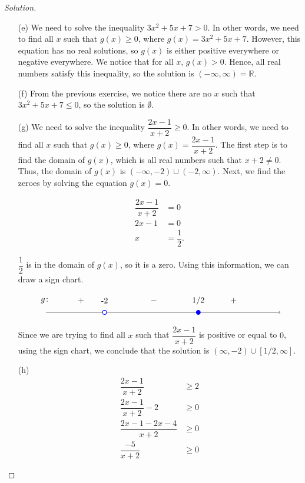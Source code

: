 \documentclass[12pt]{article}
\newenvironment{solution}{\begin{proof}[Solution]}{\end{proof}}
\begin{document}
\begin{enumerate}
\begin{solution}
\begin{itemize}
				Since $0>\dfrac{1}{4}$ is false for any $x$, there is no real solution to this inequality. We say that the solution is $\emptyset$ (the \textit{empty set}).
				\item[(e)] 	We need to solve the inequality $3x^2+5x+7> 0$. In other words, we need to find all $x$ such that $g(x) \geq 0$, where $g(x)=3x^2+5x+7$. However, this equation has no real solutions, so $g(x)$ is either positive everywhere or negative everywhere. We notice that for all $x$, $g(x)>0$. Hence, all real numbers satisfy this inequality, so the solution is $(-\infty,\infty)=\mathbb{R}$.
				\item[(f)] 	From the previous exercise, we notice there are no $x$ such that $3x^2+5x+7\leq 0$, so the solution is $\emptyset$.
				\item[(g)] 	We need to solve the inequality $\dfrac{2x-1}{x+2}\geq 0$. In other words, we need to find all $x$ such that $g(x) \geq 0$, where $g(x)=\dfrac{2x-1}{x+2}$. The first step is to find the domain of $g(x)$, which is all real numbers such that $x+2\neq0$. Thus, the domain of $g(x)$ is $(-\infty, -2) \cup (-2, \infty) $. Next, we find the zeroes by solving the equation $g(x)=0$.
				
				\begin{align*}
					\dfrac{2x-1}{x+2}&=0\\
					2x-1&=0\\
					x&=\dfrac{1}{2}.
				\end{align*}
				
				$\dfrac{1}{2}$ is in the domain of $g(x)$, so it is a zero. Using this information, we can draw a sign chart. 
				
				\[
				\begin{tikzpicture}[scale=1]
					\draw[->] (-5,0) -- (5,0);
					
					\draw (1.5,0) node[circle,blue,fill,inner sep=2pt]{};
					\draw[blue, thick, fill=white] (-2.5,0) circle (2.5pt);
					
					\node at (-2.5, .5) {-2};
					\node at (1.5, .5) {1/2};
					\node at (-5,.5) {$g\colon$};
					\node at (-3.5,.5) {$+$};
					\node at (-0.4,.5) {$-$};
					\node at (3, .5) {$+$};
				\end{tikzpicture}
				\]		
				
				Since we are trying to find all $x$ such that $\dfrac{2x-1}{x+2}$ is positive or equal to $0$, using the sign chart, we conclude that the solution is $(\infty, -2) \cup [1/2, \infty]$.
				\item[(h)] 		\begin{align*}
					\dfrac{2x-1}{x+2}&\geq 2\\
					\dfrac{2x-1}{x+2} - 2&\geq 0\\
					\dfrac{2x-1-2x-4}{x+2} &\geq 0\\
					\dfrac{-5}{x+2}&\geq 0
				\end{align*}
				

\end{itemize}
\end{solution}
\end{enumerate}
\end{document}
